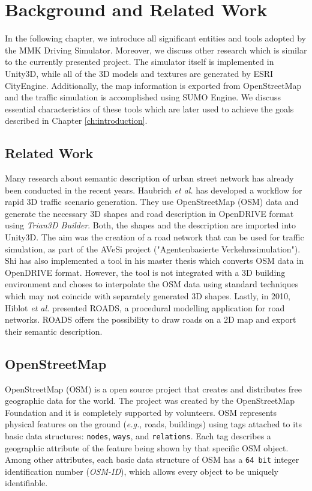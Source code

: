 \chapter{Background and Related Work}
\label{ch:background}
In the following chapter, we introduce all significant entities and tools adopted by the MMK Driving Simulator. Moreover, we discuss other research which is similar to the currently presented project. The simulator itself is implemented in Unity3D\cite{unity}, while all of the 3D models and textures are generated by ESRI CityEngine\cite{ce}. Additionally, the map information is exported from OpenStreetMap\cite{osm} and the traffic simulation is accomplished using SUMO Engine\cite{sumo}. We discuss essential characteristics of these tools which are later used to achieve the goals described in Chapter \ref{ch:introduction}. 

\section{Related Work}
Many research about semantic description of urban street network has already been conducted in the recent years. Haubrich \emph{et al.} has developed a workflow for rapid 3D traffic scenario generation\cite{haubrich2013semantic}. They use OpenStreetMap (OSM) data and generate the necessary 3D shapes and road description in OpenDRIVE format using \emph{Trian3D Builder}. Both, the shapes and the description are imported into Unity3D. The aim was the creation of a road network that can be used for traffic simulation, as part of the AVeSi project ("Agentenbasierte Verkehrssimulation"). Shi has also implemented a tool in his master thesis\cite{shi2011automatic} which converts OSM data in OpenDRIVE format. However, the tool is not integrated with a 3D building environment and choses to interpolate the OSM data using standard techniques which may not coincide with separately generated 3D shapes. Lastly, in 2010, Hiblot \emph{et al.} presented ROADS\cite{hiblot2010pro}, a procedural modelling application for road networks. ROADS offers the possibility to draw roads on a 2D map and export their semantic description.  

\section{OpenStreetMap}
\label{ch:osm}
OpenStreetMap (OSM) is a open source project that creates and distributes free geographic data for the world. The project was created by the OpenStreetMap Foundation and it is completely supported by volunteers. OSM represents physical features on the ground (\emph{e.g.}, roads, buildings) using tags attached to its basic data structures: \texttt{nodes}, \texttt{ways}, and \texttt{relations}. Each tag describes a geographic attribute of the feature being shown by that specific OSM object. Among other attributes, each basic data structure of OSM has a \texttt{64 bit} integer identification number (\emph{OSM-ID}), which allows every object to be uniquely identifiable.


